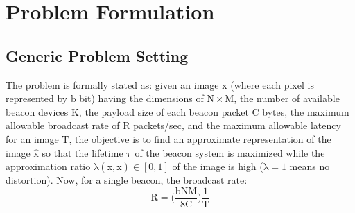 
\section{Problem Formulation}
\label{sec:problem}

\subsection{Generic Problem Setting}

The problem is formally stated as: given an image $\mathrm{x}$ (where each pixel is represented by $\mathrm{b}$ bit) having the dimensions of $\mathrm{N \times M}$, the number of available beacon devices $\mathrm{K}$, the payload size of each beacon packet $\mathrm{C}$ bytes, the maximum allowable broadcast rate of $\mathrm{R}$ packets/sec, and the maximum allowable latency for an image $\mathrm{T}$, the objective is to find an approximate representation of the image $\mathrm{\hat{x}}$ so that the lifetime $\mathrm{\tau}$ of the beacon system is maximized while the approximation ratio $\mathrm{\lambda(x, \hat{x}) \in [0,1]}$ of the image is high ($\mathrm{\lambda = 1}$ means no distortion). Now, for a single beacon, the broadcast rate:
\begin{equation}
	\mathrm{R = \bigg( \frac{bNM}{8C} \bigg) \frac{1}{T}}
	\label{eq:1}
\end{equation}

